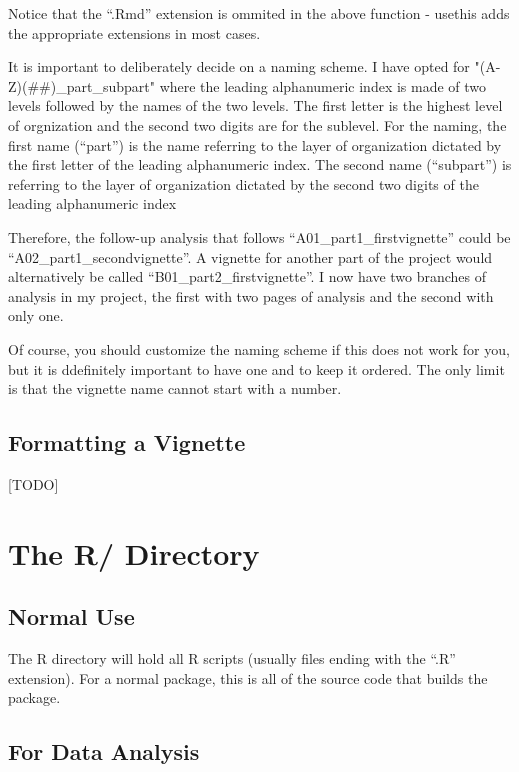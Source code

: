 \documentclass[]{book}
\begin{document}
Notice that the ``.Rmd'' extension is ommited in the above function - usethis adds the appropriate extensions in most cases.

It is important to deliberately decide on a naming scheme. I have opted for "(A-Z)(\#\#)\_part\_subpart" where the leading alphanumeric index is made of two levels followed by the names of the two levels. The first letter is the highest level of orgnization and the second two digits are for the sublevel. For the naming, the first name (``part'') is the name referring to the layer of organization dictated by the first letter of the leading alphanumeric index. The second name (``subpart'') is referring to the layer of organization dictated by the second two digits of the leading alphanumeric index

Therefore, the follow-up analysis that follows ``A01\_part1\_firstvignette'' could be ``A02\_part1\_secondvignette''. A vignette for another part of the project would alternatively be called ``B01\_part2\_firstvignette''. I now have two branches of analysis in my project, the first with two pages of analysis and the second with only one.

Of course, you should customize the naming scheme if this does not work for you, but it is ddefinitely important to have one and to keep it ordered. The only limit is that the vignette name cannot start with a number.

\hypertarget{formatting-a-vignette}{%
\subsection{Formatting a Vignette}\label{formatting-a-vignette}}

{[}TODO{]}

\hypertarget{the-r-directory}{%
\section{The R/ Directory}\label{the-r-directory}}

\hypertarget{normal-use}{%
\subsection{Normal Use}\label{normal-use}}

The R directory will hold all R scripts (usually files ending with the ``.R'' extension). For a normal package, this is all of the source code that builds the package.

\hypertarget{for-data-analysis}{%
\subsection{For Data Analysis}\label{for-data-analysis}}
\end{document}
